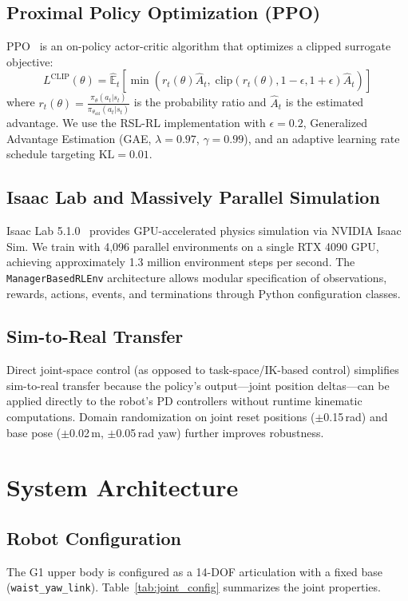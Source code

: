 \documentclass[11pt,a4paper]{article}
\begin{document}
\subsection{Proximal Policy Optimization (PPO)}
PPO~\cite{schulman2017ppo} is an on-policy actor-critic algorithm that optimizes a clipped surrogate objective:
\begin{equation}
  L^{\text{CLIP}}(\theta) = \hat{\mathbb{E}}_t\left[\min\left(r_t(\theta)\hat{A}_t,\;\text{clip}(r_t(\theta), 1-\epsilon, 1+\epsilon)\hat{A}_t\right)\right]
\end{equation}
where $r_t(\theta) = \frac{\pi_\theta(a_t|s_t)}{\pi_{\theta_{\text{old}}}(a_t|s_t)}$ is the probability ratio and $\hat{A}_t$ is the estimated advantage. We use the RSL-RL implementation with $\epsilon=0.2$, Generalized Advantage Estimation (GAE, $\lambda=0.97$, $\gamma=0.99$), and an adaptive learning rate schedule targeting $\text{KL}=0.01$.

\subsection{Isaac Lab and Massively Parallel Simulation}
Isaac Lab 5.1.0~\cite{isaaclab} provides GPU-accelerated physics simulation via NVIDIA Isaac Sim. We train with 4,096 parallel environments on a single RTX 4090 GPU, achieving approximately 1.3 million environment steps per second. The \texttt{ManagerBasedRLEnv} architecture allows modular specification of observations, rewards, actions, events, and terminations through Python configuration classes.

\subsection{Sim-to-Real Transfer}
Direct joint-space control (as opposed to task-space/IK-based control) simplifies sim-to-real transfer because the policy's output---joint position deltas---can be applied directly to the robot's PD controllers without runtime kinematic computations. Domain randomization on joint reset positions ($\pm$0.15\,rad) and base pose ($\pm$0.02\,m, $\pm$0.05\,rad yaw) further improves robustness.

\section{System Architecture}
\label{sec:architecture}

\subsection{Robot Configuration}
The G1 upper body is configured as a 14-DOF articulation with a fixed base (\texttt{waist\_yaw\_link}). Table~\ref{tab:joint_config} summarizes the joint properties.
\end{document}
